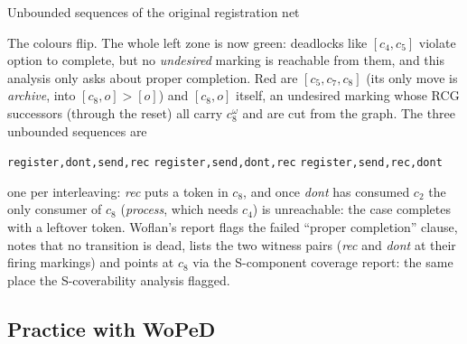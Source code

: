 \begin{examplebox}{Unbounded sequences of the original registration net}
\begin{center}
\end{center}
The colours flip. The whole left zone is now green: deadlocks like $[c_4,c_5]$ violate option to complete, but no \emph{undesired} marking is reachable from them, and this analysis only asks about proper completion. Red are $[c_5,c_7,c_8]$ (its only move is \emph{archive}, into $[c_8,o] > [o]$) and $[c_8,o]$ itself, an undesired marking whose RCG successors (through the reset) all carry $c_8^{\omega}$ and are cut from the graph. The three unbounded sequences are
\begin{center}
\texttt{register,dont,send,rec} \quad \texttt{register,send,dont,rec} \quad \texttt{register,send,rec,dont}
\end{center}
one per interleaving: \emph{rec} puts a token in $c_8$, and once \emph{dont} has consumed $c_2$ the only consumer of $c_8$ (\emph{process}, which needs $c_4$) is unreachable: the case completes with a leftover token. Woflan's report flags the failed ``proper completion'' clause, notes that no transition is dead, lists the two witness pairs (\emph{rec} and \emph{dont} at their firing markings) and points at $c_8$ via the S-component coverage report: the same place the S-coverability analysis flagged.
\end{examplebox}

\subsection{Practice with WoPeD}

